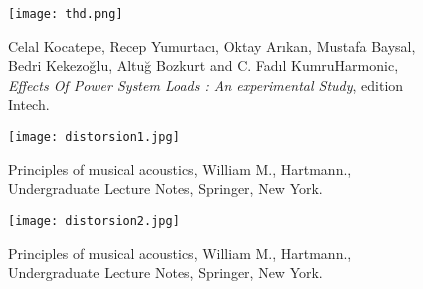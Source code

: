 \begin{figure}[!htb]
	\centering
	\texttt{[image: thd.png]}
	\caption{Celal Kocatepe, Recep Yumurtacı, Oktay Arıkan, Mustafa Baysal, Bedri Kekezoğlu, Altuğ Bozkurt and C. Fadıl KumruHarmonic,
					\textit{Effects Of Power System Loads : An experimental Study}, edition Intech.}
\end{figure}

\begin{figure}[!htb]
	\centering
	\texttt{[image: distorsion1.jpg]}
	\caption{Principles of musical acoustics, William M., Hartmann., Undergraduate Lecture Notes, Springer, New York.}
\end{figure}

\begin{figure}[!htb]
	\centering
	\texttt{[image: distorsion2.jpg]}
	\caption{Principles of musical acoustics, William M., Hartmann., Undergraduate Lecture Notes, Springer, New York.}
\end{figure}

